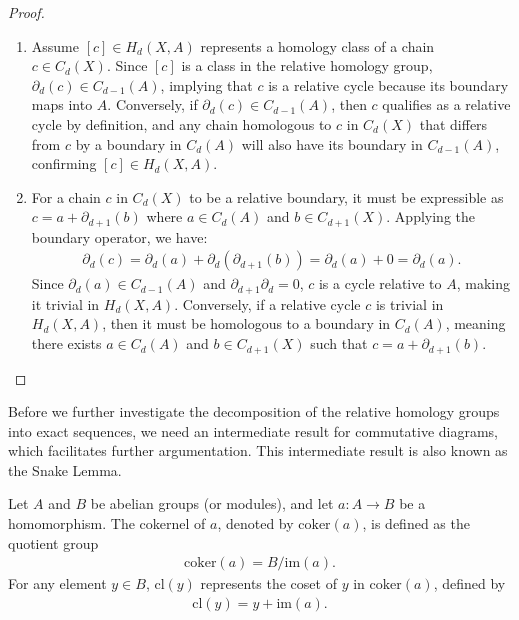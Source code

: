 \begin{proof}\noindent
	\begin{enumerate}
		\item Assume \([c] \in H_{d}(X, A)\) represents a homology class of a chain \( c \in C_{d}(X) \). Since \([c]\) is a class in the relative homology group, \( \partial_{d}(c) \in C_{d-1}(A) \), implying that \( c \) is a relative cycle because its boundary maps into \( A \). Conversely, if \( \partial_{d}(c) \in C_{d-1}(A) \), then \( c \) qualifies as a relative cycle by definition, and any chain homologous to \( c \) in \( C_{d}(X) \) that differs from \( c \) by a boundary in \( C_{d}(A) \) will also have its boundary in \( C_{d-1}(A) \), confirming \([c] \in H_{d}(X, A) \).
		\item For a chain \( c \) in \( C_{d}(X) \) to be a relative boundary, it must be expressible as \( c = a + \partial_{d+1}(b) \) where \( a \in C_{d}(A) \) and \( b \in C_{d+1}(X) \). Applying the boundary operator, we have:
		\begin{align}
		    \partial_{d}(c) = \partial_{d}(a) + \partial_{d}(\partial_{d+1}(b)) = \partial_{d}(a) + 0 = \partial_{d}(a). 
		\end{align}
		Since \( \partial_{d}(a) \in C_{d-1}(A) \) and \( \partial_{d+1}\partial_{d} = 0 \), \( c \) is a cycle relative to \( A \), making it trivial in \( H_{d}(X, A) \). Conversely, if a relative cycle \( c \) is trivial in \( H_{d}(X, A) \), then it must be homologous to a boundary in \( C_{d}(A) \), meaning there exists \( a \in C_{d}(A) \) and \( b \in C_{d+1}(X) \) such that \( c = a + \partial_{d+1}(b) \).
	\end{enumerate}
\end{proof}

Before we further investigate the decomposition of the relative homology groups into exact sequences, we need an intermediate result for commutative diagrams, which facilitates further argumentation. This intermediate result is also known as the Snake Lemma.

\begin{definition}
	Let \( A \) and \( B \) be abelian groups (or modules), and let \( a: A \to B \) be a homomorphism. The cokernel of \( a \), denoted by \( \text{coker}(a) \), is defined as the quotient group
	\begin{align}
		\text{coker}(a) = B / \text{im}(a). 
	\end{align}
	For any element \( y \in B \), \( \text{cl}(y) \) represents the coset of \( y \) in \( \text{coker}(a) \), defined by
	\begin{align}
		\text{cl}(y) = y + \text{im}(a). 
	\end{align}
\end{definition}


